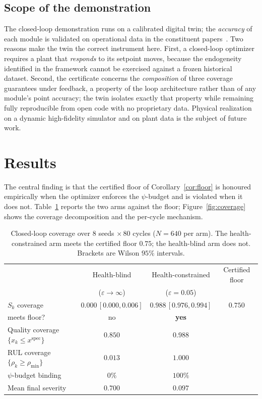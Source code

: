 \documentclass[review,12pt]{elsarticle}
\theoremstyle{definition}
\begin{document}
\subsection{Scope of the demonstration}
\label{sec:scope}

The closed-loop demonstration runs on a calibrated digital twin; the
\emph{accuracy} of each module is validated on operational data in the constituent
papers~\citep{busico_m1,busico_m2,busico_m3}. Two reasons make the twin the correct
instrument here. First, a closed-loop optimizer requires a plant that
\emph{responds} to its setpoint moves, because the endogeneity identified in the
framework cannot be exercised against a frozen historical dataset. Second, the
certificate concerns the \emph{composition} of three coverage guarantees under
feedback, a property of the loop architecture rather than of any module's point
accuracy; the twin isolates exactly that property while remaining fully
reproducible from open code with no proprietary data. Physical realization on a
dynamic high-fidelity simulator and on plant data is the subject of future work.

\section{Results}
\label{sec:results}

The central finding is that the certified floor of Corollary~\ref{cor:floor} is
honoured empirically when the optimizer enforces the $\psi$-budget and is violated
when it does not. Table~\ref{tab:coverage} reports the two arms against the floor;
Figure~\ref{fig:coverage} shows the coverage decomposition and the per-cycle
mechanism.

\begin{table}[t]
\centering
\caption{Closed-loop coverage over $8$ seeds $\times\,80$ cycles ($N=640$ per arm).
The health-constrained arm meets the certified floor $0.75$; the health-blind arm
does not. Brackets are Wilson $95\%$ intervals.}
\label{tab:coverage}
\begin{tabular}{lccc}
\toprule
 & Health-blind & Health-constrained & Certified floor \\
 & ($\varepsilon\to\infty$) & ($\varepsilon=0.05$) & \\
\midrule
$S_k$ coverage & $0.000\,[0.000,0.006]$ & $\mathbf{0.988\,[0.976,0.994]}$ & $0.750$ \\
\quad meets floor? & no & \textbf{yes} & \\
Quality coverage $\{x_k\le x^{\mathrm{spec}}\}$ & $0.850$ & $0.988$ & \\
RUL coverage $\{\rho_k\ge\rho_{\min}\}$ & $0.013$ & $1.000$ & \\
$\psi$-budget binding & $0\%$ & $100\%$ & \\
Mean final severity & $0.700$ & $0.097$ & \\
\bottomrule
\end{tabular}
\end{table}
\end{document}
